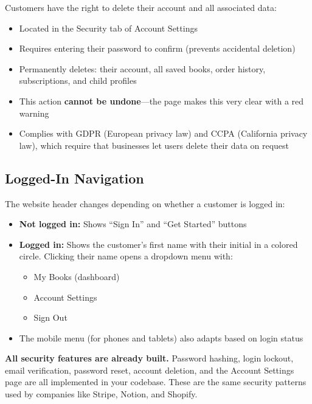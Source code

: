 \documentclass[12pt, letterpaper, oneside]{book}
\begin{document}
Customers have the right to delete their account and all associated data:

\begin{itemize}[leftmargin=2em]
  \item Located in the Security tab of Account Settings
  \item Requires entering their password to confirm (prevents accidental deletion)
  \item Permanently deletes: their account, all saved books, order history, subscriptions, and child profiles
  \item This action \textbf{cannot be undone}---the page makes this very clear with a red warning
  \item Complies with GDPR (European privacy law) and CCPA (California privacy law), which require that businesses let users delete their data on request
\end{itemize}

\subsection*{Logged-In Navigation}

The website header changes depending on whether a customer is logged in:

\begin{itemize}[leftmargin=2em]
  \item \textbf{Not logged in:} Shows ``Sign In'' and ``Get Started'' buttons
  \item \textbf{Logged in:} Shows the customer's first name with their initial in a colored circle. Clicking their name opens a dropdown menu with:
    \begin{itemize}[leftmargin=1.5em]
      \item My Books (dashboard)
      \item Account Settings
      \item Sign Out
    \end{itemize}
  \item The mobile menu (for phones and tablets) also adapts based on login status
\end{itemize}

\begin{successbox}
\textbf{All security features are already built.} Password hashing, login lockout, email verification, password reset, account deletion, and the Account Settings page are all implemented in your codebase. These are the same security patterns used by companies like Stripe, Notion, and Shopify.
\end{successbox}
\end{document}
